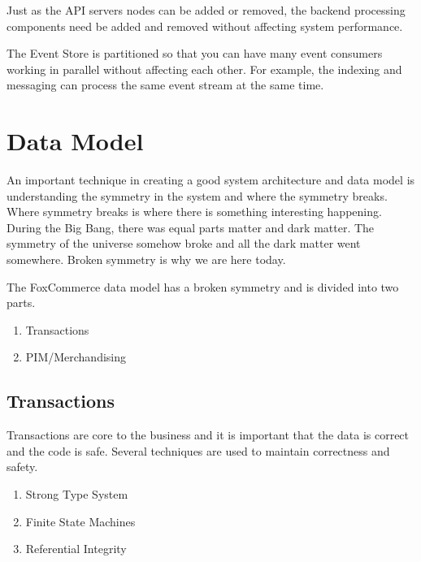 \documentclass[11pt]{article}
\begin{document}
Just as the API servers nodes can be added or removed, the backend processing
components need be added and removed without affecting system performance. 

The Event Store is partitioned so that you can have many event consumers working
in parallel without affecting each other. For example, the indexing and messaging
can process the same event stream at the same time.


\section{Data Model}

An important technique in creating a good system architecture and data model
is understanding the symmetry in the system and where the symmetry breaks. Where
symmetry breaks is where there is something interesting happening. During the Big Bang,
there was equal parts matter and dark matter. The symmetry of the universe somehow
broke and all the dark matter went somewhere. Broken symmetry is why we are here today. 

The FoxCommerce data model has a broken symmetry and is divided into two parts.

\begin{enumerate}
    \item Transactions
    \item PIM/Merchandising 
\end{enumerate}

\subsection{Transactions}

Transactions are core to the business and it is important that the data is 
correct and the code is safe. Several techniques are used to maintain correctness
and safety.

\begin{enumerate}
    \item Strong Type System
    \item Finite State Machines
    \item Referential Integrity
\end{enumerate}
\end{document}
